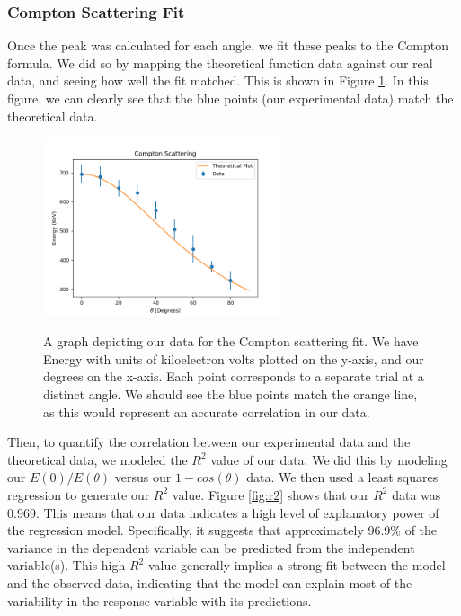 \documentclass[10pt,letterpaper,onecolumn]{article}
\begin{document}
\subsubsection*{Compton Scattering Fit}
Once the peak was calculated for each angle, we fit these peaks to the Compton formula. We did so by mapping the theoretical function data against our real data, and seeing how well the fit matched. This is shown in Figure \ref{fig:comfit}. In this figure, we can clearly see that the blue points (our experimental data) match the theoretical data. 

\begin{figure}[hbt!]
    \begin{center}
        {{\includegraphics[width=7cm]{ScatteringFit.png} }}%
        \caption{A graph depicting our data for the Compton scattering fit. We have Energy with units of kiloelectron volts plotted on the y-axis, and our degrees on the x-axis. Each point corresponds to a separate trial at a distinct angle. We should see the blue points match the orange line, as this would represent an accurate correlation in our data.}%
        \label{fig:comfit}%
    \end{center}
\end{figure}

Then, to quantify the correlation between our experimental data and the theoretical data, we modeled the $R^{2}$ value of our data. We did this by modeling our $E(0)/E(\theta)$ versus our $1 - cos(\theta)$ data. We then used a least squares regression to generate our $R^{2}$ value. Figure \ref{fig:r2} shows that our $R^{2}$ data was 0.969. This means that our data indicates a high level of explanatory power of the regression model. Specifically, it suggests that approximately 96.9\% of the variance in the dependent variable can be predicted from the independent variable(s). This high \(R^2\) value generally implies a strong fit between the model and the observed data, indicating that the model can explain most of the variability in the response variable with its predictions.
\end{document}
